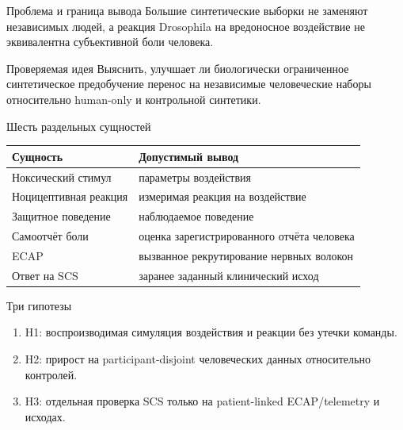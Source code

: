 \begin{frame}{Проблема и граница вывода}
Большие синтетические выборки не заменяют независимых людей, а реакция Drosophila
на вредоносное воздействие не эквивалентна субъективной боли человека.
\begin{block}{Проверяемая идея}
Выяснить, улучшает ли биологически ограниченное синтетическое предобучение перенос
на независимые человеческие наборы относительно human-only и контрольной синтетики.
\end{block}
\end{frame}
\begin{frame}{Шесть раздельных сущностей}
\small
\begin{tabularx}{\linewidth}{lX}
\toprule Сущность & Допустимый вывод \\ \midrule
Ноксический стимул & параметры воздействия \\
Ноцицептивная реакция & измеримая реакция на воздействие \\
Защитное поведение & наблюдаемое поведение \\
Самоотчёт боли & оценка зарегистрированного отчёта человека \\
ECAP & вызванное рекрутирование нервных волокон \\
Ответ на SCS & заранее заданный клинический исход \\ \bottomrule
\end{tabularx}
\end{frame}
\begin{frame}{Три гипотезы}
\begin{enumerate}
  \item H1: воспроизводимая симуляция воздействия и реакции без утечки команды.
  \item H2: прирост на participant-disjoint человеческих данных относительно контролей.
  \item H3: отдельная проверка SCS только на patient-linked ECAP/telemetry и исходах.
\end{enumerate}
\end{frame}
